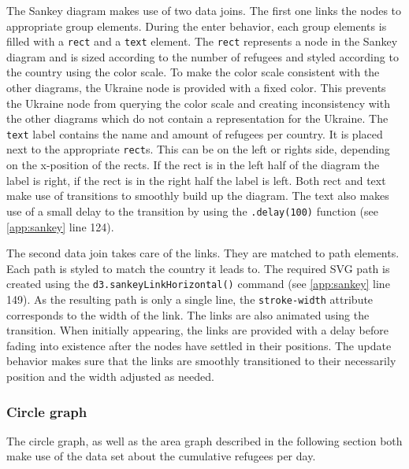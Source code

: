 The Sankey diagram makes use of two data joins. The first one links the nodes to appropriate group elements. During the enter behavior, each group elements is filled with a \texttt{rect} and a \texttt{text} element. The \texttt{rect} represents a node in the Sankey diagram and is sized according to the number of refugees and styled according to the country using the color scale. To make the color scale consistent with the other diagrams, the Ukraine node is provided with a fixed color. This prevents the Ukraine node from querying the color scale and creating inconsistency with the other diagrams which do not contain a representation for the Ukraine. The \texttt{text} label contains the name and amount of refugees per country. It is placed next to the appropriate \texttt{rect}s. This can be on the left or rights side, depending on the x-position of the rects. If the rect is in the left half of the diagram the label is right, if the rect is in the right half the label is left. Both rect and text make use of transitions to smoothly build up the diagram. The text also makes use of a small delay to the transition by using the \texttt{.delay(100)} function (see \ref{app:sankey} line 124).

The second data join takes care of the links. They are matched to path elements. Each path is styled to match the country it leads to. The required SVG path is created using the \texttt{d3.sankeyLinkHorizontal()} command (see \ref{app:sankey} line 149). As the resulting path is only a single line, the \texttt{stroke-width} attribute corresponds to the width of the link. The links are also animated using the transition. When initially appearing, the links are provided with a delay before fading into existence after the nodes have settled in their positions. The update behavior makes sure that the links are smoothly transitioned to their necessarily position and the width adjusted as needed.

\subsubsection{Circle graph}
The circle graph, as well as the area graph described in the following section both make use of the data set about the cumulative refugees per day.

